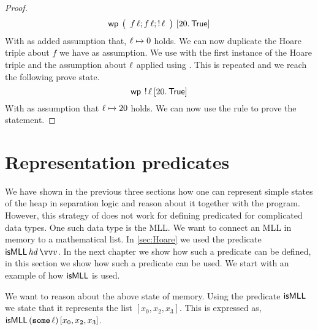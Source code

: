 \documentclass[thesis.tex]{subfiles}
\begin{document}
\begin{proof}
    \[
        \wpre{\left(\begin{array}{l}
                f\, \loc; f\, \loc; \deref \loc
            \end{array}\right)}{\Ret 20. \TRUE}
    \]
    With as added assumption that, $\loc \fmapsto 0$ holds. We can now duplicate the Hoare triple about $f$ we have as assumption. We use  with the first instance of the Hoare triple and the assumption about $\ell$ applied using . This is repeated and we reach the following prove state.
    \[
        \wpre{\deref \loc}{\Ret 20. \TRUE}
    \]
    With as assumption that $\loc \fmapsto 20$ holds. We can now use the  rule to prove the statement.

\end{proof}
\section{Representation predicates}
\label{sec:represpreds}
We have shown in the previous three sections how one can represent simple states of the heap in separation logic and reason about it together with the program. However, this strategy of does not work for defining predicated for complicated data types. One such data type is the MLL. We want to connect an MLL in memory to a mathematical list. In \cref{sec:Hoare} we used the predicate $\isMLL\, \hd\, \vect{v}$. In the next chapter we show how such a predicate can be defined, in this section we show how such a predicate can be used. We start with an example of how $\textsf{\upshape isMLL}$ is used.
\begin{center}
\end{center}
We want to reason about the above state of memory. Using the predicate $\textsf{\upshape isMLL}$ we state that it represents the list $[x_0, x_2, x_3]$. This is expressed as, $\textsf{\upshape isMLL}\,(\operatorname{\texttt{\upshape \bfseries some}}\ell)\,[x_0,x_2,x_3]$.
\end{document}
